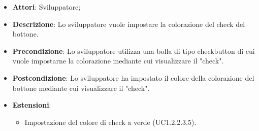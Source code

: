 
\FloatBarrier
\begin{itemize}
\item\textbf{Attori}: Sviluppatore;
\item\textbf{Descrizione}: Lo sviluppatore vuole impostare la colorazione del check del bottone.
\item\textbf{Precondizione}: Lo sviluppatore utilizza una bolla di tipo checkbutton di cui vuole impostarne la colorazione mediante cui visualizzare il "check".
\item\textbf{Postcondizione}: Lo sviluppatore ha impostato il colore della colorazione del bottone mediante cui visualizzare il "check".
\item \textbf{Estensioni}: 
\begin{itemize}
\item Impostazione del colore di check a verde (UC1.2.2.3.5).
\end{itemize}
\end{itemize}